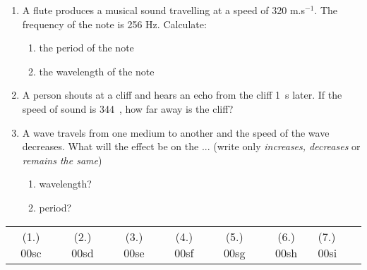 \begin{eocexercises}{}
\begin{enumerate}
\item A flute produces a musical sound travelling at a speed of 320 m.s$^{-1}$. The frequency of the note is 256 Hz. Calculate:
\begin{enumerate}
\item the period of the note
\item the wavelength of the note
\end{enumerate}

\item{A person shouts at a cliff and hears an echo from the cliff 1~s later. If the speed of sound is 344~\ms, how far away is the cliff?}

\item A wave travels from one medium to another and the speed of the wave decreases. What will the effect be on the ... (write only \emph{increases, decreases} or \emph{remains the same})
\begin{enumerate}
\item wavelength?
\item period?
\end{enumerate}
\end{enumerate}
\practiceinfo

\begin{tabular}[h]{cccccc}
(1.) 00sc & (2.) 00sd & (3.) 00se & (4.) 00sf & (5.) 00sg & (6.) 00sh & (7.) 00si & 
 \end{tabular}
\end{eocexercises}






